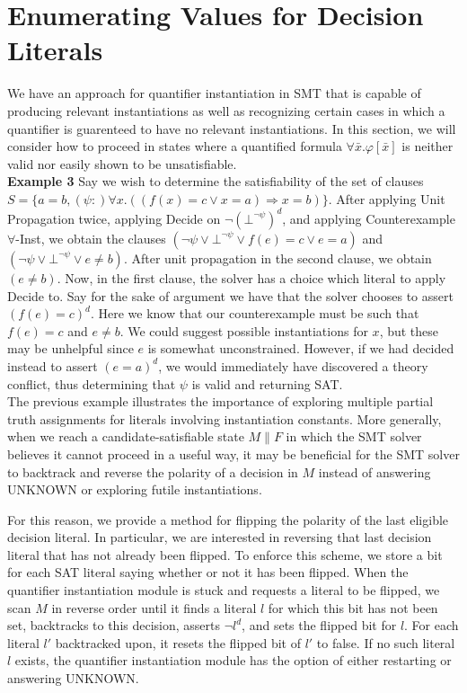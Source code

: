 \documentclass{llncs}
\begin{document}
\section{Enumerating Values for Decision Literals}

We have an approach for quantifier instantiation in SMT that is capable of producing relevant instantiations as well as recognizing certain cases in which a quantifier is guarenteed to have no relevant instantiations. 
In this section, we will consider how to proceed in states where a quantified formula $\forall \bar{x}. \varphi[ \bar{x} ]$ is neither valid nor easily shown to be unsatisfiable. \\

{\bf Example 3} 
Say we wish to determine the satisfiability of the set of clauses $S = \{ a = b, (\psi :) \forall x. ((f(x) = c \vee x = a) \Rightarrow x = b) \}$.
After applying Unit Propagation twice, applying Decide on $\neg (\bot^{ \neg \psi })^d$, and applying Counterexample $\forall$-Inst, we obtain the clauses $( \neg \psi \vee \bot^{ \neg \psi } \vee f(e) = c \vee e = a )$ and $( \neg \psi \vee \bot^{ \neg \psi } \vee e \neq b )$.
After unit propagation in the second clause, we obtain $( e \neq b )$.
Now, in the first clause, the solver has a choice which literal to apply Decide to.
Say for the sake of argument we have that the solver chooses to assert $( f(e) = c )^d$.
Here we know that our counterexample must be such that $f( e ) = c$ and $e \neq b$.
We could suggest possible instantiations for $x$, but these may be unhelpful since $e$ is somewhat unconstrained.
However, if we had decided instead to assert $( e = a )^d$, we would immediately have discovered a theory conflict, thus determining that $\psi$ is valid and returning SAT. \\

The previous example illustrates the importance of exploring multiple partial truth assignments for literals involving instantiation constants.
More generally, when we reach a candidate-satisfiable state $M \parallel F$ in which the SMT solver believes it cannot proceed in a useful way, it may be beneficial for the SMT solver to backtrack and reverse the polarity of a decision in $M$ instead of answering UNKNOWN or exploring futile instantiations.

For this reason, we provide a method for flipping the polarity of the last eligible decision literal.
In particular, we are interested in reversing that last decision literal that has not already been flipped.
To enforce this scheme, we store a bit for each SAT literal saying whether or not it has been flipped.
When the quantifier instantiation module is stuck and requests a literal to be flipped, we scan $M$ in reverse order until it finds a literal $l$ for which this bit has not been set, backtracks to this decision, asserts $\neg l^d$, and sets the flipped bit for $l$.
For each literal $l'$ backtracked upon, it resets the flipped bit of $l'$ to false.
If no such literal $l$ exists, the quantifier instantiation module has the option of either restarting or answering UNKNOWN.
\end{document}
